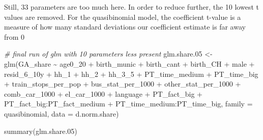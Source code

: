 \documentclass[
]{article}
\newenvironment{Shaded}{\begin{snugshade}}{\end{snugshade}}
\newcommand{\AttributeTok}[1]{\textcolor[rgb]{0.77,0.63,0.00}{#1}}
\newcommand{\CommentTok}[1]{\textcolor[rgb]{0.56,0.35,0.01}{\textit{#1}}}
\newcommand{\FloatTok}[1]{\textcolor[rgb]{0.00,0.00,0.81}{#1}}
\newcommand{\FunctionTok}[1]{\textcolor[rgb]{0.00,0.00,0.00}{#1}}
\newcommand{\NormalTok}[1]{#1}
\newcommand{\OtherTok}[1]{\textcolor[rgb]{0.56,0.35,0.01}{#1}}
\newcommand{\SpecialCharTok}[1]{\textcolor[rgb]{0.00,0.00,0.00}{#1}}
\begin{document}
Still, 33 parameters are too much here. In order to reduce further, the
10 lowest t values are removed. For the quasibinomial model, the
coefficient t-value is a measure of how many standard deviations our
coefficient estimate is far away from 0

\begin{Shaded}
\begin{Highlighting}[]
\CommentTok{\# final run of glm with 10 parameters less present}
\NormalTok{glm.share}\FloatTok{.05} \OtherTok{\textless{}{-}} \FunctionTok{glm}\NormalTok{(GA\_share }\SpecialCharTok{\textasciitilde{}}\NormalTok{  age0\_20 }\SpecialCharTok{+}\NormalTok{ birth\_munic }\SpecialCharTok{+}\NormalTok{ birth\_cant }\SpecialCharTok{+}\NormalTok{ birth\_CH }\SpecialCharTok{+}\NormalTok{ male }\SpecialCharTok{+} 
\NormalTok{    resid\_6\_10y }\SpecialCharTok{+}\NormalTok{ hh\_1 }\SpecialCharTok{+}\NormalTok{ hh\_2 }\SpecialCharTok{+}\NormalTok{ hh\_3\_5 }\SpecialCharTok{+}\NormalTok{ PT\_time\_medium }\SpecialCharTok{+}\NormalTok{ PT\_time\_big }\SpecialCharTok{+} 
\NormalTok{    train\_stops\_per\_pop }\SpecialCharTok{+}\NormalTok{ bus\_stat\_per\_1000 }\SpecialCharTok{+}\NormalTok{ other\_stat\_per\_1000 }\SpecialCharTok{+}\NormalTok{ comb\_car\_1000 }\SpecialCharTok{+} 
\NormalTok{    el\_car\_1000 }\SpecialCharTok{+}\NormalTok{ language }\SpecialCharTok{+}\NormalTok{ PT\_fact\_big }\SpecialCharTok{+}\NormalTok{ PT\_fact\_big}\SpecialCharTok{:}\NormalTok{PT\_fact\_medium }\SpecialCharTok{+} 
\NormalTok{    PT\_time\_medium}\SpecialCharTok{:}\NormalTok{PT\_time\_big, }\AttributeTok{family =}\NormalTok{ quasibinomial, }\AttributeTok{data =}\NormalTok{ d.norm.share)}



\FunctionTok{summary}\NormalTok{(glm.share}\FloatTok{.05}\NormalTok{)}
\end{Highlighting}
\end{Shaded}
\end{document}
